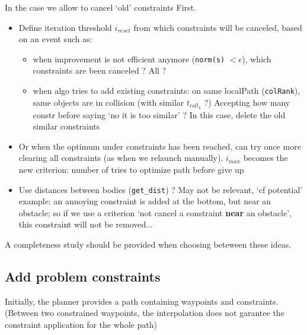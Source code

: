 \documentclass {article}
\newcommand\tcollk{t_{coll_k}}
\begin{document}
\vspace{0.4cm}
In the case we allow to cancel `old' constraints First.
\begin{itemize}
\item Define iteration threshold $i_{reset}$ from which constraints will be
canceled, based on an event such as:

\begin{itemize}
\item when improvement is not efficient anymore (\texttt{norm(s)} $< \epsilon$), which constraints are been canceled ? All ?
\item when algo tries to add existing constraints: on same localPath (\texttt{colRank}),
same objects are in collision (with similar $\tcollk$ ?) Accepting how many constr before
saying `no it is too similar' ? In this case, delete the old similar constraints
\end{itemize}

\item Or when the optimum under constraints has been reached, can try once more clearing all constraints
(as when we relaunch manually). $i_{max}$ becomes the new criterion: number of tries to optimize path before give up

\item Use distances between bodies (\texttt{get\_dist}) ? May not be relevant, `cf potential'
example: an annoying constraint is added at the bottom, but near an obstacle; so if we use a criterion `not cancel a constraint \textbf{near} an obstacle', this constraint will not be removed...

\end{itemize}

A completeness study should be provided when choosing beteween these ideas.


\vspace{0.4cm}

\subsection{Add problem constraints}
Initially, the planner provides a path containing waypoints and constraints.
(Between two constrained waypoints, the interpolation does not garantee the constraint
application for the whole path)
\end{document}

